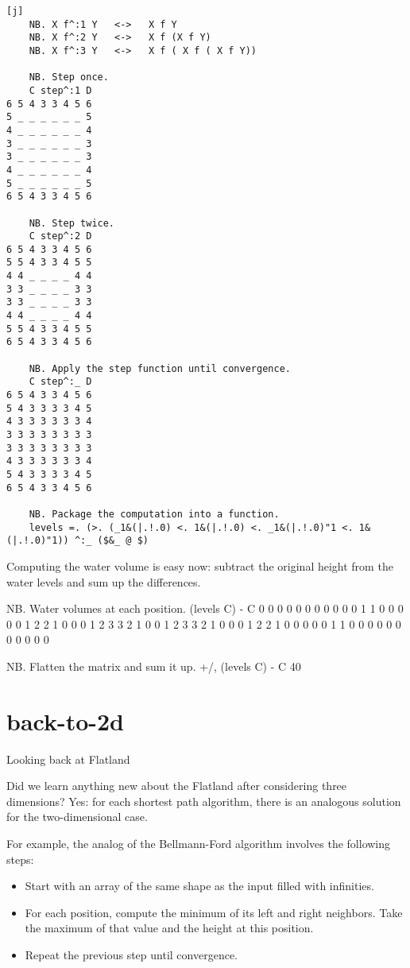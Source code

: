 \documentclass{article}
\begin{document}
\begin{verbatim}[j]
    NB. X f^:1 Y   <->   X f Y
    NB. X f^:2 Y   <->   X f (X f Y)
    NB. X f^:3 Y   <->   X f ( X f ( X f Y))

    NB. Step once.
    C step^:1 D
6 5 4 3 3 4 5 6
5 _ _ _ _ _ _ 5
4 _ _ _ _ _ _ 4
3 _ _ _ _ _ _ 3
3 _ _ _ _ _ _ 3
4 _ _ _ _ _ _ 4
5 _ _ _ _ _ _ 5
6 5 4 3 3 4 5 6

    NB. Step twice.
    C step^:2 D
6 5 4 3 3 4 5 6
5 5 4 3 3 4 5 5
4 4 _ _ _ _ 4 4
3 3 _ _ _ _ 3 3
3 3 _ _ _ _ 3 3
4 4 _ _ _ _ 4 4
5 5 4 3 3 4 5 5
6 5 4 3 3 4 5 6

    NB. Apply the step function until convergence.
    C step^:_ D
6 5 4 3 3 4 5 6
5 4 3 3 3 3 4 5
4 3 3 3 3 3 3 4
3 3 3 3 3 3 3 3
3 3 3 3 3 3 3 3
4 3 3 3 3 3 3 4
5 4 3 3 3 3 4 5
6 5 4 3 3 4 5 6

    NB. Package the computation into a function.
    levels =. (>. (_1&(|.!.0) <. 1&(|.!.0) <. _1&(|.!.0)"1 <. 1&(|.!.0)"1)) ^:_ ($&_ @ $)
\end{verbatim}

Computing the water volume is easy now: subtract the original height from the water levels and sum up the differences.

\begin{code}[j]
    NB. Water volumes at each position.
    (levels C) - C
0 0 0 0 0 0 0 0
0 0 0 1 1 0 0 0
0 0 1 2 2 1 0 0
0 1 2 3 3 2 1 0
0 1 2 3 3 2 1 0
0 0 1 2 2 1 0 0
0 0 0 1 1 0 0 0
0 0 0 0 0 0 0 0

    NB. Flatten the matrix and sum it up.
    +/, (levels C) - C
40
\end{code}

\section{back-to-2d}{Looking back at Flatland}

Did we learn anything new about the Flatland after considering three dimensions?
Yes: for each shortest path algorithm, there is an analogous solution for the two-dimensional case.

For example, the analog of the Bellmann-Ford algorithm involves the following steps:
\begin{itemize}
  \item Start with an array of the same shape as the input filled with infinities.
  \item
    For each position, compute the minimum of its left and right neighbors.
    Take the maximum of that value and the height at this position.
  \item Repeat the previous step until convergence.
\end{itemize}
\end{document}
